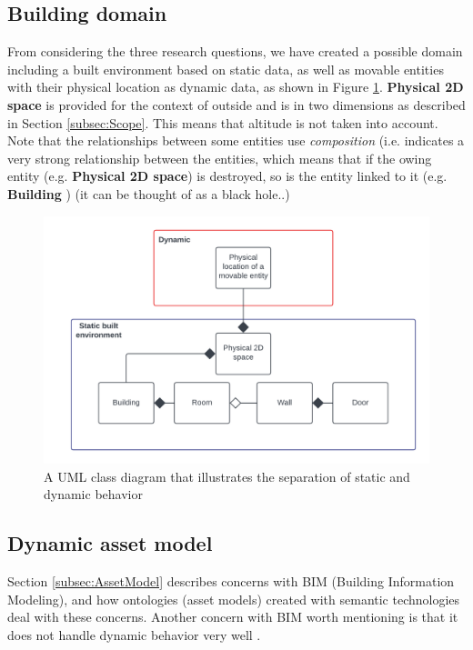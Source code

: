 \documentclass{article}
\begin{document}
\subsection{Building domain}\label{subsec:BuildingDomain}
From considering the three research questions, we have created a possible domain including a built environment based on static data, as well as movable entities with their physical location as dynamic data, as shown in Figure \ref{fig:static_built_environment}. \textbf{Physical 2D space} is provided for the context of outside and is in two dimensions as described in Section \ref{subsec:Scope}. This means that altitude is not taken into account. Note that the relationships between some entities use \emph{composition} (i.e. indicates a very strong relationship between the entities, which means that if the owing entity (e.g. \textbf{Physical 2D space}) is destroyed, so is the entity linked to it (e.g. \textbf{Building} \cite{pilone_uml_2005}) (it can be thought of as a black hole..)

\begin{figure}[H]
    \centering
    \includegraphics[scale=0.16]{graphics/static_built_environment.png}
    \caption{A UML class diagram that illustrates the separation of static and dynamic behavior}
    \label{fig:static_built_environment}
\end{figure}


\subsection{Dynamic asset model}\label{subsubsec:DynamicAssetModel}
Section \ref{subsec:AssetModel} describes concerns with BIM (Building Information Modeling), and how ontologies (asset models) created with semantic technologies deal with these concerns. Another concern with BIM worth mentioning is that it does not handle dynamic behavior very well \cite{kamburjan_digital_2022}.
\end{document}
